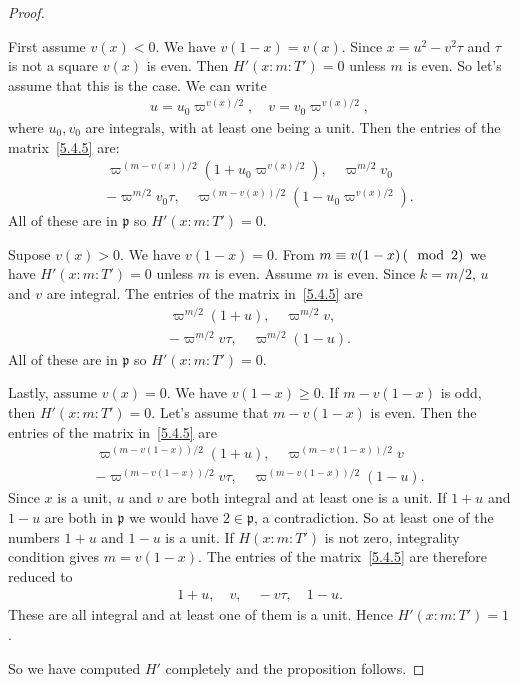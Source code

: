 \begin{proof}
\begin{itemize}
\end{itemize}
First assume $v(x) <0$.
We have $v(1-x) = v(x)$.
Since $x =u^2 - v^2 \tau$ and $\tau$ is not a square $v(x)$ is even.
Then $H'(x:m:T')=0$ unless $m$ is even.
So let's assume that this is the case.
We can write
\begin{align*}
    u = u_0 \varpi^{v(x) /2}, \quad v = v_0 \varpi^{v(x) / 2},
\end{align*}
where $u_0, v_0$ are integrals, with at least one being a unit.
Then the entries of the matrix~\eqref{5.4.5} are:
\begin{align*}
    \varpi^{(m  - v(x)) / 2} (1 + u_0 \varpi^{v(x) / 2}), \quad \varpi^{m/2}v_0 \\
    -\varpi^{m/2} v_0 \tau, \quad \varpi^{(m - v(x))/2} (1 - u_0 \varpi^{v(x) / 2}).
\end{align*}
All of these are in $\mathfrak{p}$ so $H'(x:m:T') = 0$.

Supose $v(x) > 0$. We have $v(1 - x) = 0$.
From $m \equiv v(1-x)\,(\mathrm{\mod}\,2)$ we have $H'(x:m:T') = 0$ unless $m$ is even.
Assume $m$ is even.
Since $k = m / 2$, $u$ and $v$ are integral.
The entries of the matrix in~\eqref{5.4.5} are
\begin{align*}
    \varpi^{m/2} (1+u), \quad \varpi^{m/2} v, \\
    -\varpi^{m/2} v\tau, \quad \varpi^{m/2} (1 - u).
\end{align*}
All of these are in $\mathfrak{p}$ so $H'(x:m:T') =0$.

Lastly, assume $v(x) = 0$. We have $v(1 - x) \geq 0$.
If $m - v(1-x)$ is odd, then $H'(x:m:T') =0$. Let's assume that $m - v(1-x)$ is even.
Then the entries of the matrix in~\eqref{5.4.5} are
\begin{align*}
    \varpi^{(m - v(1-x))/2} (1 +u), \quad \varpi^{(m - v(1-x))/2} v \\
    -\varpi^{(m - v(1-x)) /2} v\tau, \quad \varpi^{(m - v(1-x)) / 2} (1 - u).
\end{align*}
Since $x$ is a unit, $u$ and $v$ are both integral and at least one is a unit.
If $1 + u$ and $1 - u$ are both in $\mathfrak{p}$ we would have $2 \in \mathfrak{p}$, a contradiction.
So at least one of the numbers $1 +u$ and $1 - u$ is a unit.
If $H(x:m:T')$ is not zero, integrality condition gives $m = v(1-x)$.
The entries of the matrix~\eqref{5.4.5} are therefore reduced to
\begin{align*}
    1+u, \quad v, \quad -v\tau, \quad 1 -u.
\end{align*}
These are all integral and at least one of them is a unit. Hence $H'(x:m:T') = 1$.

So we have computed $H'$ completely and the proposition follows.
\end{proof}

